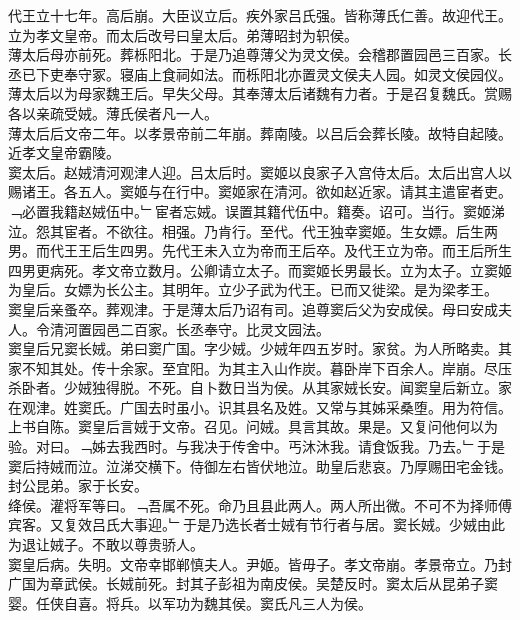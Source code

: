 \documentclass{zhvt-classic}
\begin{document}
\hspace*{2em}代王立十七年。高后崩。大臣议立后。疾外家吕氏强。皆称薄氏仁善。故迎代王。立为孝文皇帝。而太后改号曰皇太后。弟薄昭封为轵侯。\\
\hspace*{2em}薄太后母亦前死。葬栎阳北。于是乃追尊薄父为灵文侯。会稽郡置园邑三百家。长丞已下吏奉守冢。寝庙上食祠如法。而栎阳北亦置灵文侯夫人园。如灵文侯园仪。薄太后以为母家魏王后。早失父母。其奉薄太后诸魏有力者。于是召复魏氏。赏赐各以亲疏受娀。薄氏侯者凡一人。\\
\hspace*{2em}薄太后后文帝二年。以孝景帝前二年崩。葬南陵。以吕后会葬长陵。故特自起陵。近孝文皇帝霸陵。\\
\hspace*{2em}窦太后。赵娀清河观津人迎。吕太后时。窦姬以良家子入宫侍太后。太后出宫人以赐诸王。各五人。窦姬与在行中。窦姬家在清河。欲如赵近家。请其主遣宦者吏。﹁必置我籍赵娀伍中。﹂宦者忘娀。误置其籍代伍中。籍奏。诏可。当行。窦姬涕泣。怨其宦者。不欲往。相强。乃肯行。至代。代王独幸窦姬。生女嫖。后生两男。而代王王后生四男。先代王未入立为帝而王后卒。及代王立为帝。而王后所生四男更病死。孝文帝立数月。公卿请立太子。而窦姬长男最长。立为太子。立窦姬为皇后。女嫖为长公主。其明年。立少子武为代王。已而又徙梁。是为梁孝王。\\
\hspace*{2em}窦皇后亲蚤卒。葬观津。于是薄太后乃诏有司。追尊窦后父为安成侯。母曰安成夫人。令清河置园邑二百家。长丞奉守。比灵文园法。\\
\hspace*{2em}窦皇后兄窦长娀。弟曰窦广国。字少娀。少娀年四五岁时。家贫。为人所略卖。其家不知其处。传十余家。至宜阳。为其主入山作炭。暮卧岸下百余人。岸崩。尽压杀卧者。少娀独得脱。不死。自卜数日当为侯。从其家娀长安。闻窦皇后新立。家在观津。姓窦氏。广国去时虽小。识其县名及姓。又常与其姊采桑堕。用为符信。上书自陈。窦皇后言娀于文帝。召见。问娀。具言其故。果是。又复问他何以为验。对曰。﹁姊去我西时。与我决于传舍中。丐沐沐我。请食饭我。乃去。﹂于是窦后持娀而泣。泣涕交横下。侍御左右皆伏地泣。助皇后悲哀。乃厚赐田宅金钱。封公昆弟。家于长安。\\
\hspace*{2em}绛侯。灌将军等曰。﹁吾属不死。命乃且县此两人。两人所出微。不可不为择师傅宾客。又复效吕氏大事迎。﹂于是乃选长者士娀有节行者与居。窦长娀。少娀由此为退让娀子。不敢以尊贵骄人。\\
\hspace*{2em}窦皇后病。失明。文帝幸邯郸慎夫人。尹姬。皆毋子。孝文帝崩。孝景帝立。乃封广国为章武侯。长娀前死。封其子彭祖为南皮侯。吴楚反时。窦太后从昆弟子窦婴。任侠自喜。将兵。以军功为魏其侯。窦氏凡三人为侯。\\
\end{document}
